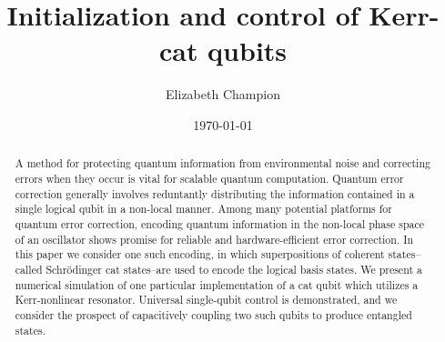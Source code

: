 \documentclass[a4paper, amsfonts, amssymb, amsmath, reprint, showkeys, nofootinbib, twoside]{revtex4-1}
\begin{document}
\title{Initialization and control of Kerr-cat qubits}

\author{Elizabeth Champion}

\date{\today} %

\begin{abstract}
    \noindent A method for protecting quantum information from environmental noise and correcting errors when they occur is vital for scalable quantum computation.
    Quantum error correction generally involves reduntantly distributing the information contained in a single logical qubit in a non-local manner.
    Among many potential platforms for quantum error correction, encoding quantum information in the non-local phase space of an oscillator shows promise for reliable and hardware-efficient error correction.
    In this paper we consider one such encoding, in which superpositions of coherent states--called Schr\"odinger cat states--are used to encode the logical basis states.
    We present a numerical simulation of one particular implementation of a cat qubit which utilizes a Kerr-nonlinear resonator.
    Universal single-qubit control is demonstrated, and we consider the prospect of capacitively coupling two such qubits to produce entangled states.
\end{abstract}


\maketitle






\end{document}
